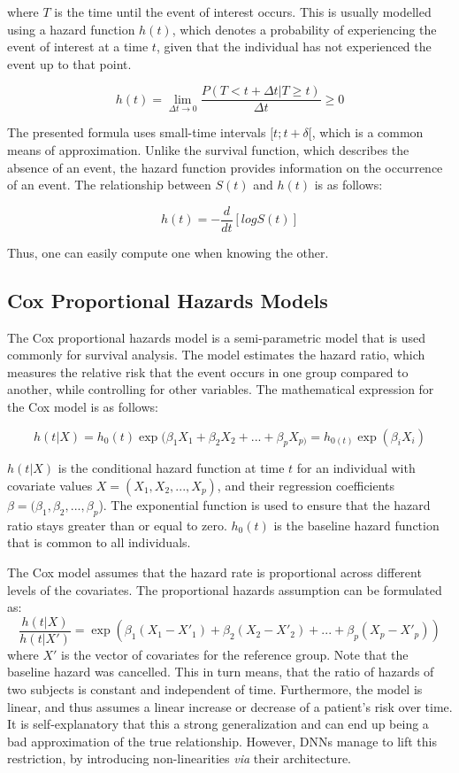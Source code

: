 where $T$ is the time until the event of interest occurs. This is usually modelled using a hazard function \(h(t)\), which denotes a probability of experiencing the event of interest at a time \(t\), given that the individual has not experienced the event up to that point.

\[ h(t) = \lim_{\Delta t \to 0} \frac{P(T < t+\Delta t| T\geq t)}{\Delta t} \ge 0 \]

The presented formula uses small-time intervals $[t; t+\delta[$, which is a common means of approximation.
Unlike the survival function, which describes the absence of an event, the hazard function provides information on the occurrence of an event.
The relationship between $S(t)$ and $h(t)$ is as follows:

\[ h(t)=-\frac{d}{dt}[logS(t)] \]

Thus, one can easily compute one when knowing the other. \cite{Clark2003Survival}

\subsection{Cox Proportional Hazards Models}
The Cox proportional hazards model is a semi-parametric model that is used commonly for survival analysis. \cite{Cox1972Regression} The model estimates the hazard ratio, which measures the relative risk that the event occurs in one group compared to another, while controlling for other variables. The mathematical expression for the Cox model is as follows:

\[ h(t|X) = h_0(t) \exp(\beta_1 X_1 + \beta_2 X_2 + ... + \beta_p X_{p)}= h_{0(t)} \exp(\beta_{i} X_{i}) \]

 \(h(t|X)\) is the conditional hazard function at time \(t\) for an individual with covariate values \(X = (X_1, X_2, ..., X_p)\), and their regression coefficients \(\beta = (\beta_{1}, \beta_{2}, ..., \beta_{p}\)). The exponential function is used to ensure that the hazard ratio stays greater than or equal to zero. \(h_0(t)\) is the baseline hazard function that is common to all individuals.

The Cox model assumes that the hazard rate is proportional across different levels of the covariates. The proportional hazards assumption can be formulated as:
\[ \frac{h(t|X)}{h(t|X')} = \exp(\beta_1 (X_1 - X'_1) + \beta_2 (X_2 - X'_2) + ... + \beta_p (X_p - X'_p)) \]
where $X'$ is the vector of covariates for the reference group. Note that the baseline hazard was cancelled. This in turn means, that the ratio of hazards of two subjects is constant and independent of time.
Furthermore, the model is linear, and thus assumes a linear increase or decrease of a patient's risk over time. It is self-explanatory that this a strong generalization and can end up being a bad approximation of the true relationship. \cite{Deo2021Survival} However, DNNs manage to lift this restriction, by introducing non-linearities \textit{via} their architecture.

